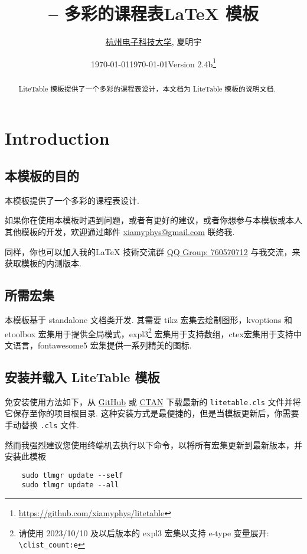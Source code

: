 \documentclass[11pt]{article}
\title{\bfseries\pkg{LiteTable} -- 多彩的课程表\textsf{\LaTeX} 模板}
\author{\href{https://www.hdu.edu.cn}{杭州电子科技大学}, 夏明宇}
\date{\today}
\affil{\href{mailto:xiamyphys@gmail.com}{\texttt{xiamyphys@gmail.com}}}
\date{\today\quad Version 2.4b\thanks{%
  \url{https://github.com/xiamyphys/litetable}}}
\def\pkg#1{\texorpdfstring{\textcolor{pkgcolor}{\textsf{#1}}}{“#1”}}
\begin{document}
\maketitle

\vspace{-2em}
\begin{abstract}
\pkg{LiteTable} 模板提供了一个多彩的课程表设计，本文档为 \pkg{LiteTable} 模板的说明文档.
\end{abstract}

\tableofcontents

\clearpage

\section{Introduction}

\subsection{本模板的目的}
本模板提供了一个多彩的课程表设计. 

如果你在使用本模板时遇到问题，或者有更好的建议，或者你想参与本模板或本人其他模板的开发，欢迎通过邮件 \href{mailto:xiamyphys@gmail.com}{xiamyphys@gmail.com} 联络我.

同样，你也可以加入我的\textsf\LaTeX{} 技術交流群 \href{https://qm.qq.com/q/OnHzbNvVAG}{QQ Group: 760570712} 与我交流，来获取模板的内测版本.

\subsection{所需宏集}
本模板基于 \pkg{standalone} 文档类开发. 其需要 \pkg{tikz} 宏集去绘制图形，\pkg{kvoptions} 和 \pkg{etoolbox} 宏集用于提供全局模式，\pkg{expl3}\footnote{请使用 2023/10/10 及以后版本的 \pkg{expl3} 宏集以支持 e-type 变量展开: \verb|\clist_count:e|} 宏集用于支持数组，\pkg{ctex}宏集用于支持中文语言，\pkg{fontawesome5} 宏集提供一系列精美的图标.

\subsection{安装并载入 \pkg{LiteTable} 模板}
免安装使用方法如下，从 \href{https://github.com/xiamyphys/LiteTable}{GitHub} 或 \href{https://ctan.org/pkg/litetable}{CTAN} 下载最新的 \verb|litetable.cls| 文件并将它保存至你的项目根目录. 这种安装方式是最便捷的，但是当模板更新后，你需要手动替换 \verb|.cls| 文件.

然而我强烈建议您使用终端机去执行以下命令，以将所有宏集更新到最新版本，并安装此模板
\begin{verbatim}
    sudo tlmgr update --self
    sudo tlmgr update --all
\end{verbatim}
\end{document}
